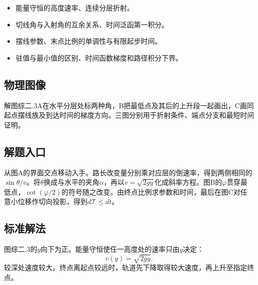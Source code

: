 \documentclass[UTF8,fontset=fandol,a4paper,11pt]{ctexart}
\begin{document}
\begin{itemize}
\item 能量守恒的高度速率、连续分层折射。
\item 切线角与入射角的互余关系、时间泛函第一积分。
\item 摆线参数、末点比例的单调性与有限起步时间。
\item 驻值与最小值的区别、时间函数梯度和路径积分下界。
\end{itemize}



\subsection*{物理图像}

解图综二.3A在水平分层处标两种角，B把最低点及其后的上升段一起画出，C画同起点摆线族及到达时间的梯度方向。三图分别用于折射条件、端点分支和最短时间证明。



\subsection*{解题入口}

从图A的界面交点移动入手。路长改变量分别乘对应层的倒速率，得到两侧相同的$\sin\theta/v$。将$\theta$换成与水平的夹角$\alpha$，再以$v=\sqrt{2gy}$化成斜率方程。图B的$\varphi$贯穿最低点，$\cot(\varphi/2)$的符号随之改变。由终点比例求参数和时间，最后在图C对任意小位移作切向投影，得到$d\mathcal T\le dt$。



\subsection*{标准解法}


图综二.3的$y$向下为正。能量守恒使任一高度处的速率只由$y$决定：
\[
v(y)=\sqrt{2gy}.
\]
较深处速度较大。终点离起点较远时，轨道先下降取得较大速度，再上升至指定终点。
\end{document}

